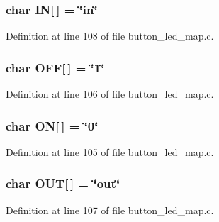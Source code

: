 \subsubsection[{I\-N}]{\setlength{\rightskip}{0pt plus 5cm}char I\-N[$\,$] = \char`\"{}in\char`\"{}\hspace{0.3cm}{\ttfamily [static]}}\label{button__led__map_8c_ace73f8c95b0f3dc04a4b18387b41bc39}


Definition at line 108 of file button\-\_\-led\-\_\-map.\-c.

\subsubsection[{O\-F\-F}]{\setlength{\rightskip}{0pt plus 5cm}char O\-F\-F[$\,$] = \char`\"{}1\char`\"{}\hspace{0.3cm}{\ttfamily [static]}}\label{button__led__map_8c_a78377576c916f3f2e9f390eddca2e110}


Definition at line 106 of file button\-\_\-led\-\_\-map.\-c.

\subsubsection[{O\-N}]{\setlength{\rightskip}{0pt plus 5cm}char O\-N[$\,$] = \char`\"{}0\char`\"{}\hspace{0.3cm}{\ttfamily [static]}}\label{button__led__map_8c_a068c69649cbf2d1cc5cc0f0adacd4f29}


Definition at line 105 of file button\-\_\-led\-\_\-map.\-c.

\subsubsection[{O\-U\-T}]{\setlength{\rightskip}{0pt plus 5cm}char O\-U\-T[$\,$] = \char`\"{}out\char`\"{}\hspace{0.3cm}{\ttfamily [static]}}\label{button__led__map_8c_a6455dee27f6b58284b96e1ba34688649}


Definition at line 107 of file button\-\_\-led\-\_\-map.\-c.

